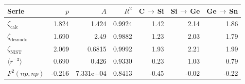 \begin{tabular}{lrrrrrr}
    \toprule
    Serie & $p$ & $A$ & $R^2$ & C\,$\to$\,Si & Si\,$\to$\,Ge & Ge\,$\to$\,Sn \\
    \midrule
    $\zeta_{\text{calc}}$ & 1.824 & 1.424 & 0.9924 & 1.42 & 2.14 & 1.86 \\
    $\zeta_{\text{desnudo}}$ & 1.690 & 2.49 & 0.9882 & 1.23 & 2.03 & 1.79 \\
    $\zeta_{\text{NIST}}$ & 2.069 & 0.6815 & 0.9992 & 1.93 & 2.21 & 1.99 \\
    $\langle r^{-3}\rangle$ & 0.690 & 0.426 & 0.9330 & 0.23 & 1.03 & 0.79 \\
    $F^2(np,np)$ & -0.216 & 7.331e+04 & 0.8413 & -0.45 & -0.02 & -0.22 \\
    \bottomrule
\end{tabular}

